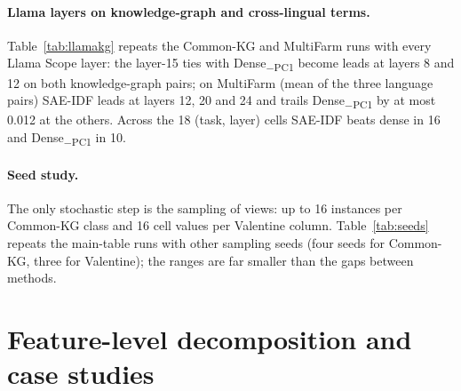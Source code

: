 \documentclass[11pt]{article}
\newcommand{\method}{SAE\mbox{-}IDF\xspace}
\newcommand{\pcone}{Dense\textsubscript{$-$PC1}\xspace}
\begin{document}
\paragraph{Llama layers on knowledge-graph and cross-lingual terms.}
Table~\ref{tab:llamakg} repeats the Common-KG and MultiFarm runs with every Llama Scope layer: the layer-15 ties with \pcone become leads at layers 8 and 12 on both knowledge-graph pairs; on MultiFarm (mean of the three language pairs) \method leads at layers 12, 20 and 24 and trails \pcone by at most 0.012 at the others. Across the 18 (task, layer) cells \method beats dense in 16 and \pcone in 10.

\begin{table}[H]
  \centering\footnotesize
  
  \caption{Llama-3.1-8B layer sweep on Common-KG and MultiFarm (mean of the three pairs), native views, MRR.}
  \label{tab:llamakg}
\end{table}

\paragraph{Seed study.}
The only stochastic step is the sampling of views: up to 16 instances per Common-KG class and 16 cell values per Valentine column.
Table~\ref{tab:seeds} repeats the main-table runs with other sampling seeds (four seeds for Common-KG, three for Valentine); the ranges are far smaller than the gaps between methods.

\begin{table}[H]
  \centering\footnotesize
  
  \caption{Mean $\pm$ half-range over sampling seeds (MRR unless stated). Gemma-2-9B, layer 20, 131k SAE.}
  \label{tab:seeds}
\end{table}

\begin{table}[H]
  \centering\footnotesize
  \setlength{\tabcolsep}{4pt}
  
  \caption{All 39 ablation configurations (78 runs) on miniF2F Lean~4 $\to$ HOL Light and $\to$ Metamath (MRR). Gemma Scope widths are given at the sparsity used; ``$L_0$'' rows are the 131k-feature SAE at layer 20. \method beats Dense, \pcone and SAE-unweighted in every run.}
  \label{tab:ablationfull}
\end{table}

\section{Feature-level decomposition and case studies}
\label{app:cases}
\end{document}
